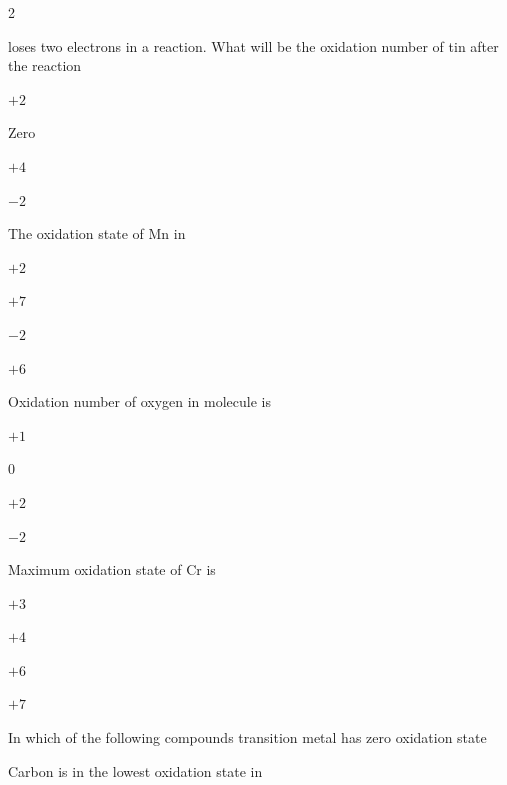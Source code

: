 \documentclass[10pt,a4paper]{article}
\begin{document}
\begin{multicols}{2}
\begin{questions}[start=1]
\item {} loses two electrons in a reaction. What will be the oxidation number of tin after the reaction
\begin{options}
  \item $+2$
  \item Zero
  \item $+4$
  \item $-2$
\end{options}

\item The oxidation state of Mn in 
\begin{options}
  \item $+2$
  \item $+7$
  \item $-2$
  \item $+6$
\end{options}

\item Oxidation number of oxygen in  molecule is
\begin{options}
  \item $+1$
  \item 0
  \item $+2$
  \item $-2$
\end{options}

\item Maximum oxidation state of Cr is
\begin{options}
  \item $+3$
  \item $+4$
  \item $+6$
  \item $+7$
\end{options}

\item In which of the following compounds transition metal has zero oxidation state
\begin{options}
  \item {}
  \item {}
  \item {}
  \item \ce{[Fe(CO)5]}
\end{options}

\item Carbon is in the lowest oxidation state in
\begin{options}
  \item {}
  \item {}
  \item {}
  \item {}
\end{options}


\end{questions}
\end{multicols}
\end{document}
